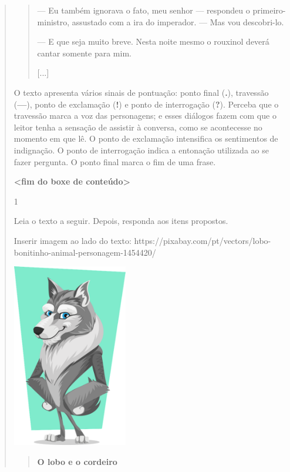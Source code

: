 \begin{boxlist}
\begin{quote}
\begin{iteize}
{\begin{quote}
--- Eu também ignorava o fato, meu senhor --- respondeu o
primeiro-ministro, assustado com a ira do imperador. --- Mas vou
descobri-lo.

--- E que seja muito breve. Nesta noite mesmo o rouxinol deverá cantar
somente para mim.

{[}...{]}

\end{quote}

O texto apresenta vários sinais de pontuação: ponto final (\textbf{.}),
travessão (\textbf{---}), ponto de exclamação (\textbf{!}) e ponto de
interrogação (\textbf{?}). Perceba que o travessão marca a voz das
personagens; e esses diálogos fazem com que o leitor tenha a sensação de
assistir à conversa, como se acontecesse no momento em que lê. O ponto
de exclamação intensifica os sentimentos de indignação. O ponto de
interrogação indica a entonação utilizada ao se fazer pergunta. O ponto
final marca o fim de uma frase.

\textbf{\textless{}fim do boxe de conteúdo\textgreater{}}


\num{1}

Leia o texto a seguir. Depois, responda aos itens propostos.

Inserir imagem ao lado do texto:
https://pixabay.com/pt/vectors/lobo-bonitinho-animal-personagem-1454420/

\includegraphics[width=1.97917in,height=3.16667in]{media/image5.png}

\begin{quote}
\textbf{O lobo e o cordeiro}


\end{quote}}
\end{iteize}
\end{quote}
\end{boxlist}
